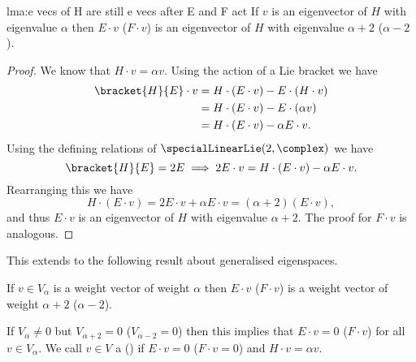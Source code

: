 \documentclass[fleqn]{NotesClass}
\begin{document}
    \begin{lma}{}{lma:e vecs of H are still e vecs after E and F act}
        If \(v\) is an eigenvector of \(H\) with eigenvalue \(\alpha\) then \(E \cdot v\) (\(F \cdot v\)) is an eigenvector of \(H\) with eigenvalue \(\alpha + 2\) (\(\alpha - 2\)).
        \begin{proof}
            We know that \(H \cdot v = \alpha v\).
            Using the action of a Lie bracket we have
            \begin{align}
                \bracket{H}{E} \cdot v &= H \cdot (E \cdot v) - E \cdot (H \cdot v)\\
                &= H \cdot (E \cdot v) - E \cdot (\alpha v)\\
                &= H \cdot (E \cdot v) - \alpha E\cdot v.
            \end{align}
            Using the defining relations of \(\specialLinearLie(2, \complex)\) we have
            \begin{equation}
                \bracket{H}{E} = 2E \implies 2E \cdot v = H \cdot (E \cdot v) - \alpha E \cdot v.
            \end{equation}
            Rearranging this we have
            \begin{equation}
                H \cdot (E \cdot v) = 2E \cdot v + \alpha E \cdot v = (\alpha + 2)(E \cdot v),
            \end{equation}
            and thus \(E \cdot v\) is an eigenvector of \(H\) with eigenvalue \(\alpha + 2\).
            The proof for \(F \cdot v\) is analogous.
        \end{proof}
    \end{lma}
    
    This extends to the following result about generalised eigenspaces.
    
    \begin{lma}{}{}
        If \(v \in V_\alpha\) is a weight vector of weight \(\alpha\) then \(E \cdot v\) (\(F \cdot v\)) is a weight vector of weight \(\alpha + 2\) (\(\alpha - 2\)).
    \end{lma}
    
    If \(V_\alpha \ne 0\) but \(V_{\alpha + 2} = 0\) (\(V_{\alpha - 2} = 0\)) then this implies that \(E \cdot v = 0\) (\(F \cdot v\)) for all \(v \in V_\alpha\).
    We call \(v \in V\) a  () if \(E \cdot v = 0\) (\(F \cdot v = 0\)) and \(H \cdot v = \alpha v\).
    
\end{document}
